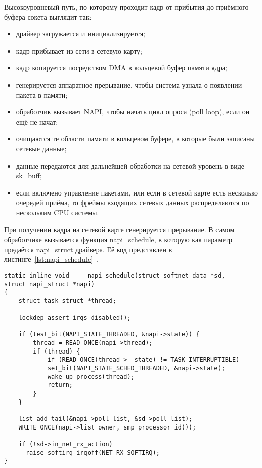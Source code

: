 Высокоуровневый путь, по которому проходит кадр от прибытия до приёмного буфера сокета выглядит так:
\begin{itemize}[label=---]
	\item драйвер загружается и инициализируется;
	\item кадр прибывает из сети в сетевую карту;
	\item кадр копируется посредством DMA в кольцевой буфер памяти ядра;
	\item генерируется аппаратное прерывание, чтобы система узнала о появлении пакета в памяти;
	\item обработчик вызывает NAPI, чтобы начать цикл опроса (poll loop), если он ещё не начат;
	\item очищаются те области памяти в кольцевом буфере, в которые были записаны сетевые данные;
	\item данные передаются для дальнейшей обработки на сетевой уровень в виде sk\_buff;
	\item если включено управление пакетами, или если в сетевой карте есть несколько очередей приёма, то фреймы входящих сетевых данных распределяются по нескольким CPU системы.
\end{itemize}

При получении кадра на сетевой карте генерируется прерывание. В самом обработчике вызывается функция napi\_schedule, в которую как параметр предаётся napi\_struct драйвера. Её код представлен в листинге~\ref{lst:napi_schedule}~\cite{napi_schedule}.

\begin{center}
	\captionsetup{justification=raggedright,singlelinecheck=off}
	\begin{lstlisting}[label=lst:napi_schedule,caption=Функция \_\_\_\_napi\_schedule,showstringspaces=false]
static inline void ____napi_schedule(struct softnet_data *sd,
struct napi_struct *napi)
{
	struct task_struct *thread;
	
	lockdep_assert_irqs_disabled();
	
	if (test_bit(NAPI_STATE_THREADED, &napi->state)) {
		thread = READ_ONCE(napi->thread);
		if (thread) {
			if (READ_ONCE(thread->__state) != TASK_INTERRUPTIBLE)
			set_bit(NAPI_STATE_SCHED_THREADED, &napi->state);
			wake_up_process(thread);
			return;
		}
	}
	
	list_add_tail(&napi->poll_list, &sd->poll_list);
	WRITE_ONCE(napi->list_owner, smp_processor_id());

	if (!sd->in_net_rx_action)
	__raise_softirq_irqoff(NET_RX_SOFTIRQ);
}
	\end{lstlisting}
\end{center}
\FloatBarrier

